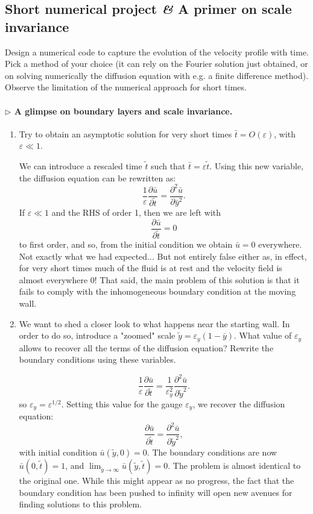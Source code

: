\documentclass[11pt,a4paper]{article}
\newcommand{\pd}[2]{\frac{\partial #1}{\partial #2}}
\newcommand{\prg}[1]{\paragraph{$\rhd$ #1}}
\begin{document}
\subsection*{Short numerical project \textit{\&} A primer on scale invariance}
Design a numerical code to capture the evolution of the velocity profile with time. Pick a method of your choice (it can rely on the Fourier solution just obtained, or on solving numerically the diffusion equation with e.g. a finite difference method). Observe the limitation of the numerical approach for short times.
\prg{A glimpse on boundary layers and scale invariance.} 
\begin{enumerate}
\item Try to obtain an asymptotic solution for very short times $\bar t = O(\varepsilon)$, with $\varepsilon \ll 1$.
\begin{answer}
We can introduce a rescaled time $\tilde t$ such that $\bar t = \varepsilon \tilde t$. Using this new variable, the diffusion equation can be rewritten as:
$$
\frac{1}{\varepsilon}\pd{\bar u}{\tilde t}=\pd{^2 \bar u}{\bar y^2}.
$$ 
If $\varepsilon \ll 1$ and the RHS of order 1, then we are left with 
$$
\pd{\bar u}{\tilde t}=0
$$
to first order, and so, from the initial condition we obtain $\bar u = 0$ everywhere. Not exactly what we had expected... But not entirely false either as, in effect, for very short times much of the fluid is at rest and the velocity field is almost everywhere 0! That said, the main problem of this solution is that it fails to comply with the inhomogeneous boundary condition at the moving wall.
\end{answer}
\item We want to shed a closer look to what happens near the starting wall. In order to do so, introduce a "zoomed" scale $\tilde y = \varepsilon_y (1-\bar y)$. What value of $\varepsilon_y$ allows to recover all the terms of the diffusion equation? Rewrite the boundary conditions using these variables.
\begin{answer}
$$
\frac{1}{\varepsilon}\pd{\bar u}{\tilde t}=\frac{1}{\varepsilon_y^2}\pd{^2 \bar u}{\tilde y^2}.
$$ 
so 
$\varepsilon_y = \varepsilon^{1/2}$. Setting this value for the gauge $\varepsilon_y$, we recover the diffusion equation:
$$
\pd{\bar u}{\tilde t}=\pd{^2 \bar u}{\tilde y^2},
$$ 
with initial condition $\bar u(\tilde y,0) = 0$. The boundary conditions are now $\bar u(0, \tilde t) = 1$, and $\lim_{\tilde y\to\infty}\bar u(\tilde y, \tilde t) = 0$. The problem is almost identical to the original one. While this might appear as no progress, the fact that the boundary condition has been pushed to infinity will open new avenues for finding solutions to this problem.

\end{answer}
\end{enumerate}
\end{document}
